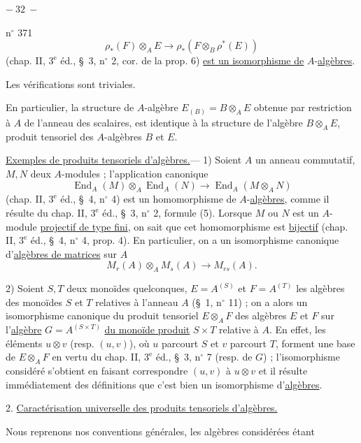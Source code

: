 \begin{center}$-\ 32\ -$\end{center}
\hfill n$^\circ$ 371
\[
\rho_*(F)\otimes_A E\longrightarrow\rho_*(F\otimes_B\rho^*(E))
\]
(chap. II, $3^{\mathrm e}$ éd., \S\ 3, n$^\circ$ 2, cor. de la prop. 6) \uline{est un isomorphisme de} $A$-\uline{algèbres}.

Les vérifications sont triviales.

En particulier, la structure de $A$-algèbre  $E_{(B)}=B\otimes_A E$ obtenue par restriction à $A$ de l'anneau des scalaires, est identique à la structure de l'algèbre $B\otimes_A E$, produit tensoriel des $A$-algèbres $B$ et $E$.

\uline{Exemples de produits tensoriels d'algèbres.}--- 1) Soient $A$ un anneau commutatif, $M,N$ deux $A$-modules ; l'application canonique
\[
\operatorname{End}_A(M)\otimes_A\operatorname{End}_A(N)\longrightarrow\operatorname{End}_A(M\otimes_A N)
\]
(chap. II, $3^{\mathrm e}$ éd., \S\ 4, n$^\circ$ 4) est un homomorphisme de $A$-\uline{algèbres}, comme il résulte du chap. II, $3^{\mathrm e}$ éd., \S\ 3, n$^\circ$ 2, formule (5). Lorsque $M$ ou $N$ est un $A$-module \uline{projectif de type fini}, on sait que cet homomorphisme est \uline{bijectif} (chap. II, $3^{\mathrm e}$ éd., \S\ 4, n$^\circ$ 4, prop. 4). En particulier, on a un isomorphisme canonique d'\uline{algèbres de matrices} sur $A$
\[
M_r(A)\otimes_A M_s(A)\longrightarrow M_{rs}(A).
\]

2) Soient $S,T$ deux monoïdes quelconques, $E=A^{(S)}$ et $F=A^{(T)}$ les algèbres des monoïdes $S$ et $T$ relatives à l'anneau $A$ (\S\ 1, n$^\circ$ 11) ; on a alors un isomorphisme canonique du produit tensoriel $E\otimes_A F$ des algèbres $E$ et $F$ sur l'\uline{algèbre} $G=A^{(S\times T)}$ \uline{du monoïde produit} $S\times T$ relative à $A$. En effet, les éléments $u\otimes v$ (resp. $(u,v)$), où $u$ parcourt $S$ et $v$ parcourt $T$, forment une base de $E\otimes_A F$ en vertu du chap. II, $3^{\mathrm e}$ éd., \S\ 3, n$^\circ$ 7 (resp. de $G$) ; l'isomorphisme considéré s'obtient en faisant correspondre $(u,v)$ à $u\otimes v$ et il résulte immédiatement des définitions que c'est bien un isomorphisme d'\uline{algèbres}.

2. \uline{Caractérisation universelle des produits tensoriels d'algèbres.}

Nous reprenons nos conventions générales, les algèbres considérées étant
